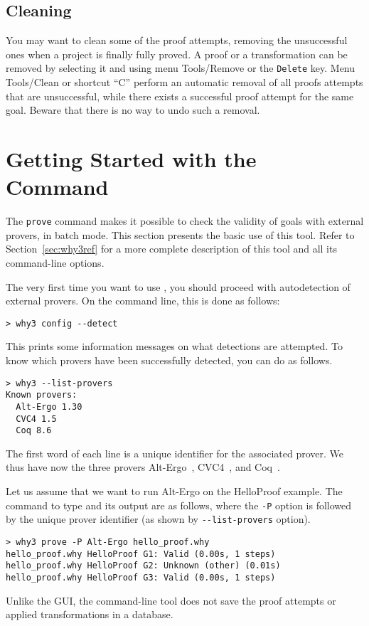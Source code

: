 \subsection{Cleaning}

You may want to clean some of the proof attempts, \eg removing the
unsuccessful ones when a project is finally fully proved.
A proof or a transformation can be removed by selecting it and
using menu \textsf{Tools/Remove} or the \texttt{Delete} key.
Menu \textsf{Tools/Clean} or shortcut ``C'' perform an automatic removal of all
proofs attempts that are unsuccessful, while there exists a successful proof
attempt for the same goal.
Beware that there is no way to undo such a removal.

\section{Getting Started with the \why Command}
\label{sec:batch}

The \texttt{prove} command makes it possible to check the validity of goals with external
provers, in batch mode. This section presents the basic use of this
tool. Refer to Section~\ref{sec:why3ref} for a more complete
description of this tool and all its command-line options.

The very first time you want to use \why, you should proceed with
autodetection of external provers.
On the command line, this is done as follows:
\begin{verbatim}
> why3 config --detect
\end{verbatim}
This prints some information messages on what detections are attempted. To know which
provers have been successfully detected, you can do as follows.
\begin{verbatim}
> why3 --list-provers
Known provers:
  Alt-Ergo 1.30
  CVC4 1.5
  Coq 8.6
\end{verbatim}
The first word of each line
is a unique identifier for the associated prover. We thus have now the
three provers Alt-Ergo~\cite{ergo}, CVC4~\cite{barrett11cade}, and
Coq~\cite{CoqArt}.

Let us assume that we want to run Alt-Ergo on the HelloProof
example. The command to type and its output are as follows, where the
\verb|-P| option is followed by the unique prover identifier (as shown
by \verb|--list-provers| option).
\begin{verbatim}
> why3 prove -P Alt-Ergo hello_proof.why
hello_proof.why HelloProof G1: Valid (0.00s, 1 steps)
hello_proof.why HelloProof G2: Unknown (other) (0.01s)
hello_proof.why HelloProof G3: Valid (0.00s, 1 steps)
\end{verbatim}
Unlike the \why GUI, the command-line tool does not save the proof attempts
or applied transformations in a database.

